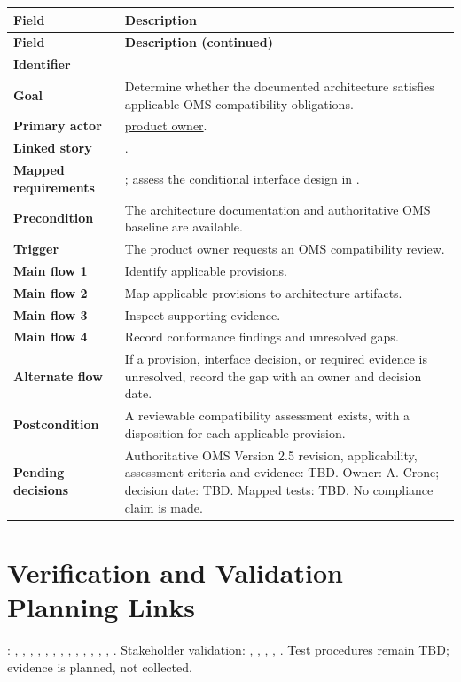 \begin{tabularx}{\linewidth}{L{3.2cm}Y}
\caption{Assess Architecture Compatibility with OMS\label{Table:UC006}}\\
\toprule\textbf{Field} & \textbf{Description}\\\midrule\endfirsthead
\toprule\textbf{Field} & \textbf{Description (continued)}\\\midrule\endhead\bottomrule\endlastfoot
\textbf{Identifier} & \\
\textbf{Goal} & Determine whether the documented architecture satisfies applicable OMS compatibility obligations.\\
\textbf{Primary actor} & \hyperref[Stakeholder:ProductOwner]{product owner}.\\
\textbf{Linked story} & .\\
\textbf{Mapped requirements} & ; assess the conditional interface design in .\\
\textbf{Precondition} & The architecture documentation and authoritative OMS baseline are available.\\
\textbf{Trigger} & The product owner requests an OMS compatibility review.\\
\textbf{Main flow 1} & Identify applicable provisions.\\
\textbf{Main flow 2} & Map applicable provisions to architecture artifacts.\\
\textbf{Main flow 3} & Inspect supporting evidence.\\
\textbf{Main flow 4} & Record conformance findings and unresolved gaps.\\
\textbf{Alternate flow} & If a provision, interface decision, or required evidence is unresolved, record the gap with an owner and decision date.\\
\textbf{Postcondition} & A reviewable compatibility assessment exists, with a disposition for each applicable provision.\\
\textbf{Pending decisions} & Authoritative OMS Version 2.5 revision, applicability, assessment criteria and evidence: TBD. Owner: A. Crone; decision date: TBD. Mapped tests: TBD. No compliance claim is made.\\
\end{tabularx}

\section{Verification and Validation Planning Links}
: , , , , , , , , , , , , , . Stakeholder validation: , , , , . Test procedures remain TBD; evidence is planned, not collected.

